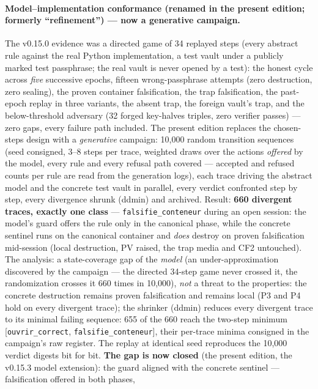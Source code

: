 \documentclass[10pt,a4paper]{article}
\newcommand{\code}[1]{\texttt{\small #1}}
\begin{document}
\paragraph{Model--implementation conformance (renamed in the present
edition; formerly ``refinement'') --- now a generative campaign.} The
v0.15.0 evidence was a directed game of 34 replayed steps (every
abstract rule against the real Python implementation, a test vault
under a publicly marked test passphrase; the real vault is never opened
by a test): the honest cycle across \emph{five} successive epochs, fifteen
wrong-passphrase attempts (zero destruction, zero sealing), the proven
container falsification, the trap falsification, the past-epoch replay
in three variants, the absent trap, the foreign vault's trap, and the
below-threshold adversary (32 forged key-halves triples, zero verifier
passes) --- zero gaps, every failure path included. The present edition
replaces the chosen-steps design with a \emph{generative} campaign:
10{,}000 random transition sequences (seed consigned, 3--8 steps per
trace, weighted draws over the actions \emph{offered} by the model,
every rule and every refusal path covered --- accepted and refused
counts per rule are read from the generation logs), each trace driving
the abstract model and the concrete test vault in parallel, every
verdict confronted step by step, every divergence shrunk (ddmin) and
archived. Result: \textbf{660 divergent traces, exactly one class} ---
\code{falsifie\_conteneur} during an open session: the model's guard
offers the rule only in the canonical phase, while the concrete
sentinel runs on the canonical container and \emph{does} destroy on
proven falsification mid-session (local destruction, PV raised, the
trap media and CF2 untouched). The analysis: a state-coverage gap of
the \emph{model} (an under-approximation discovered by the campaign
--- the directed 34-step game never crossed it, the randomization
crosses it 660 times in 10{,}000), \emph{not} a threat to the
properties: the concrete destruction remains proven falsification and
remains local (P3 and P4 hold on every divergent trace); the shrinker
(ddmin) reduces every divergent trace to its minimal failing sequence:
655 of the 660 reach the two-step minimum [\code{ouvrir\_correct},
\code{falsifie\_conteneur}], their per-trace minima consigned in the
campaign's raw register. The replay at identical seed reproduces the
10{,}000 verdict digests bit for bit. \textbf{The gap is now closed}
(the present edition, the v0.15.3 model extension): the guard aligned
with the concrete sentinel --- falsification offered in both phases,
\end{document}
